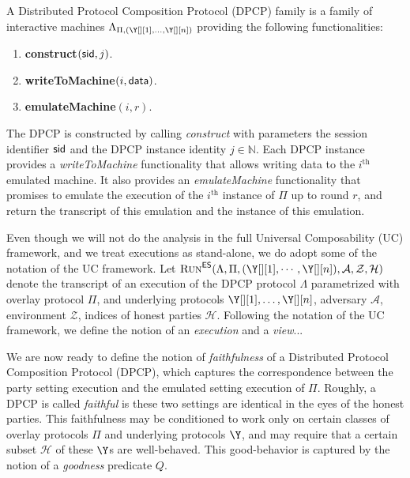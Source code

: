 \begin{definition}
  A Distributed Protocol Composition Protocol (DPCP) family
  is a family of interactive machines
  $\Lambda_{\Pi,(\Y[][1], \ldots, \Y[][n])}$ providing the following
  functionalities:

  \begin{enumerate}
    \item \textbf{construct}$(\textsf{sid}, j)$.
    \item \textbf{writeToMachine}$(i, \textsf{data})$.
    \item \textbf{emulateMachine}$(i, r)$. %
  \end{enumerate}
\end{definition}

The DPCP is constructed by calling \emph{construct} with parameters the session identifier $\textsf{sid}$
and the DPCP instance identity $j \in \mathbb{N}$. Each DPCP instance provides a \emph{writeToMachine}
functionality that allows writing data to the $i^\text{th}$ emulated machine.
It also provides an \emph{emulateMachine} functionality that promises to emulate the execution of
the $i^\text{th}$ instance of $\Pi$ up to round $r$, and return the transcript of this emulation
and the instance of this emulation.

Even though we will not do the analysis in the full Universal Composability (UC) framework, and
we treat executions as stand-alone, we do adopt some of the notation of the UC framework.
Let $\LCExec(\Lambda, \Pi, ({\Y[][1]}, \cdots, {\Y[][n]}), \mathcal{A}, \mathcal{Z}, \mathcal{H})$
denote the transcript of an execution of the DPCP protocol $\Lambda$ parametrized with overlay protocol $\Pi$,
and underlying protocols $\Y[][1], \ldots, \Y[][n]$, adversary $\mathcal{A}$, environment $\mathcal{Z}$,
indices of honest parties $\mathcal{H}$.
Following the notation of the UC framework, we define the notion of an \emph{execution}
and a \emph{view}... %

We are now ready to define the notion of \emph{faithfulness} of a
Distributed Protocol Composition Protocol (DPCP), which captures the
correspondence between the party setting execution and the emulated setting
execution of $\Pi$. Roughly, a DPCP is called \emph{faithful} is these
two settings are identical in the eyes of the honest parties.
This faithfulness may be conditioned to work only on certain classes
of overlay protocols $\Pi$ and underlying protocols $\Y$, and may
require that a certain subset $\mathcal{H}$ of these $\Y$s are well-behaved.
This good-behavior is captured by the notion of a \emph{goodness} predicate $Q$.

